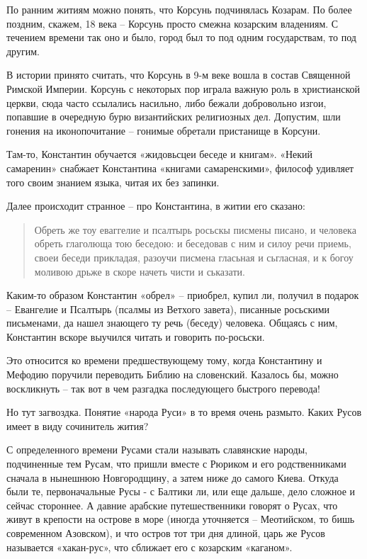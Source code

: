 \documentclass[a5paper,11pt,openany]{article}
\begin{document}
По ранним житиям можно понять, что Корсунь подчинялась Козарам. По более поздним, скажем, 18 века – Корсунь просто смежна козарским владениям. С течением времени так оно и было, город был то под одним государствам, то под другим. 

В истории принято считать, что Корсунь в 9-м веке вошла в состав Священной Римской Империи. Корсунь с некоторых пор играла важную роль в христианской церкви, сюда часто ссылались насильно, либо бежали добровольно изгои, попавшие в очередную бурю византийских религиозных дел. Допустим, шли гонения на иконопочитание – гонимые обретали пристанище в Корсуни.

Там-то, Константин обучается «жидовьсцеи беседе и книгам». «Некий самаренин» снабжает Константина «книгами самаренскими», философ удивляет того своим знанием языка, читая их без запинки.

Далее происходит странное – про Константина, в житии его сказано\cite{teodorov01}:

\begin{quotation}
Обреть же тоу еваггелие и псалтырь росьскы писмены писано, и человека обреть глаголюща тою беседою: и беседовав с ним и силоу речи приемь, своеи беседи прикладая, разоучи писмена гласьная и сьгласная, и к богоу моливою дрьже в скоре начеть чисти и ськазати.
\end{quotation}

Каким-то образом Константин «обрел» – приобрел, купил ли, получил в подарок – Евангелие и Псалтырь (псалмы из Ветхого завета), писанные росьскими письменами, да нашел знающего ту речь (беседу) человека. Общаясь с ним, Константин вскоре выучился читать и говорить по-росьски.

Это относится ко времени предшествующему тому, когда Константину и Мефодию поручили переводить Библию на словенский. Казалось бы, можно воскликнуть – так вот в чем разгадка последующего быстрого перевода!

Но тут загвоздка. Понятие «народа Руси» в то время очень размыто. Каких Русов имеет в виду сочинитель жития? 

С определенного времени Русами стали называть славянские народы, подчиненные тем Русам, что пришли вместе с Рюриком и его родственниками сначала в нынешнюю Новгородщину, а затем ниже до самого Киева. Откуда были те, первоначальные Русы - с Балтики ли, или еще дальше, дело сложное и сейчас стороннее. А давние арабские путешественники говорят о Русах, что живут в крепости на острове в море (иногда уточняется – Меотийском, то бишь современном Азовском), и что остров тот три дня длиной, царь же Русов называется «хакан-рус», что сближает его с козарским «каганом». 
\end{document}
